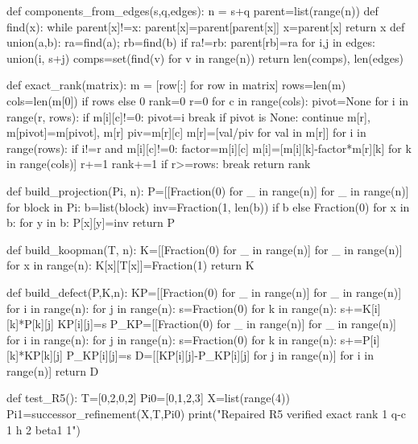 def components_from_edges(s,q,edges):
    n = s+q
    parent=list(range(n))
    def find(x):
        while parent[x]!=x:
            parent[x]=parent[parent[x]]
            x=parent[x]
        return x
    def union(a,b):
        ra=find(a); rb=find(b)
        if ra!=rb:
            parent[rb]=ra
    for i,j in edges:
        union(i, s+j)
    comps=set(find(v) for v in range(n))
    return len(comps), len(edges)

def exact_rank(matrix):
    m = [row[:] for row in matrix]
    rows=len(m)
    cols=len(m[0]) if rows else 0
    rank=0
    r=0
    for c in range(cols):
        pivot=None
        for i in range(r, rows):
            if m[i][c]!=0:
                pivot=i
                break
        if pivot is None:
            continue
        m[r], m[pivot]=m[pivot], m[r]
        piv=m[r][c]
        m[r]=[val/piv for val in m[r]]
        for i in range(rows):
            if i!=r and m[i][c]!=0:
                factor=m[i][c]
                m[i]=[m[i][k]-factor*m[r][k] for k in range(cols)]
        r+=1
        rank+=1
        if r>=rows:
            break
    return rank

def build_projection(Pi, n):
    P=[[Fraction(0) for _ in range(n)] for _ in range(n)]
    for block in Pi:
        b=list(block)
        inv=Fraction(1, len(b)) if b else Fraction(0)
        for x in b:
            for y in b:
                P[x][y]=inv
    return P

def build_koopman(T, n):
    K=[[Fraction(0) for _ in range(n)] for _ in range(n)]
    for x in range(n):
        K[x][T[x]]=Fraction(1)
    return K

def build_defect(P,K,n):
    KP=[[Fraction(0) for _ in range(n)] for _ in range(n)]
    for i in range(n):
        for j in range(n):
            s=Fraction(0)
            for k in range(n):
                s+=K[i][k]*P[k][j]
            KP[i][j]=s
    P_KP=[[Fraction(0) for _ in range(n)] for _ in range(n)]
    for i in range(n):
        for j in range(n):
            s=Fraction(0)
            for k in range(n):
                s+=P[i][k]*KP[k][j]
            P_KP[i][j]=s
    D=[[KP[i][j]-P_KP[i][j] for j in range(n)] for i in range(n)]
    return D

def test_R5():
    T=[0,2,0,2]
    Pi0=[{0,1},{2,3}]
    X=list(range(4))
    Pi1=successor_refinement(X,T,Pi0)
    print("Repaired R5 verified exact rank 1 q-c 1 h 2 beta1 1")

